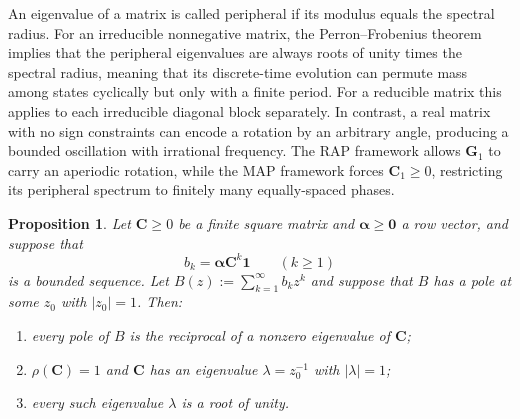 \documentclass[11pt]{article}
\newtheorem{proposition}[theorem]{Proposition}
\theoremstyle{definition}
\theoremstyle{remark}
\newcommand{\bzero}{\bm{0}}
\begin{document}
An eigenvalue of a matrix is called peripheral if its modulus equals the spectral radius. For an irreducible nonnegative matrix, the Perron--Frobenius theorem implies that the peripheral eigenvalues are always roots of unity times the spectral radius, meaning that its discrete-time evolution can permute mass among states cyclically but only with a finite period. For a reducible matrix this applies to each irreducible diagonal block separately. In contrast, a real matrix with no sign constraints can encode a rotation by an arbitrary angle, producing a bounded oscillation with irrational frequency. The RAP framework allows $\bm{G}_1$ to carry an aperiodic rotation, while the MAP framework forces $\bm{C}_1\ge 0$, restricting its peripheral spectrum to finitely many equally-spaced phases.

\begin{proposition}\label{prop:matrix-obstruction}
Let $\bm{C}\ge 0$ be a finite square matrix and $\bm{\alpha}\ge\bzero$ a row vector, and suppose that
\[
b_k=\bm{\alpha}\bm{C}^k\bm{1} \qquad (k\ge 1)
\]
is a bounded sequence. Let $B(z):=\sum_{k=1}^\infty b_k z^k$ and suppose that $B$ has a pole at some $z_0$ with $|z_0|=1$. Then:
\begin{enumerate}[label=(\roman*)]
\item every pole of $B$ is the reciprocal of a nonzero eigenvalue of $\bm{C}$;
\item $\rho(\bm{C})=1$ and $\bm{C}$ has an eigenvalue $\lambda=z_0^{-1}$ with $|\lambda|=1$;
\item every such eigenvalue $\lambda$ is a root of unity.
\end{enumerate}
\end{proposition}
\end{document}
